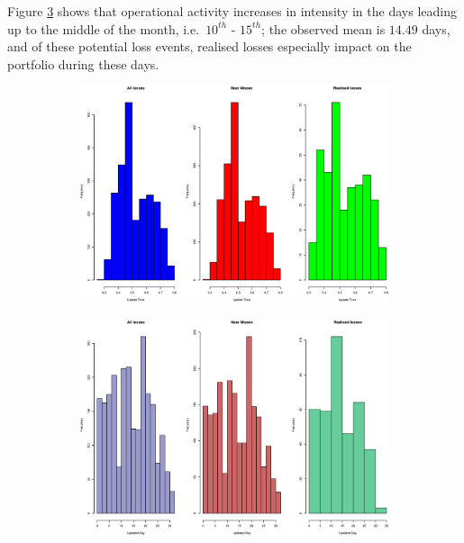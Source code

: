\documentclass{DissertateUSU}
\begin{document}
Figure \ref{Exploratory_UpdateDay_Frequency3plot} shows that operational
activity increases in intensity in the days leading up to the middle of
the month, i.e.~\(10^{th}\) - \(15^{th}\); the observed mean is
\(14.49\) days, and of these potential loss events, realised losses
especially impact on the portfolio during these days.

\singlespacing

\doublespacing

\begin{figure}
\centering
\begin{subfigure}[b]{0.55\textwidth}
   \includegraphics[width=1.5\linewidth]{Exploratory_UpdateTime_Frequency3plot.eps}
   \label{Exploratory_UpdateTime_Frequency3plot} 
\end{subfigure}

\begin{subfigure}[b]{0.55\textwidth}
   \includegraphics[width=1.5\linewidth]{Exploratory_UpdateDay_Frequency3plot.eps}
   \label{Exploratory_UpdateDay_Frequency3plot}
\end{subfigure}


\end{figure}
\end{document}
